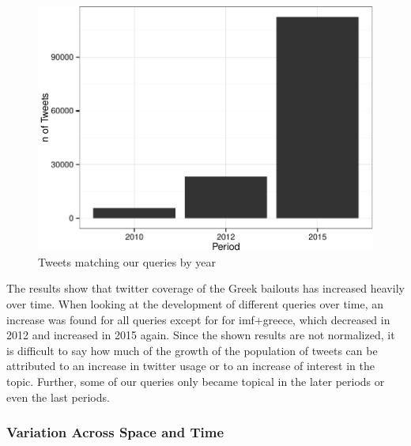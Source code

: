 \documentclass[]{article}
\begin{document}
\begin{figure}

{\centering \includegraphics{fin_paper_files/figure-latex/unnamed-chunk-4-1} 

}

\caption{Tweets matching our queries by year}\label{fig:unnamed-chunk-4}
\end{figure}

The results show that twitter coverage of the Greek bailouts has
increased heavily over time. When looking at the development of
different queries over time, an increase was found for all queries
except for for imf+greece, which decreased in 2012 and increased in 2015
again. Since the shown results are not normalized, it is difficult to
say how much of the growth of the population of tweets can be attributed
to an increase in twitter usage or to an increase of interest in the
topic. Further, some of our queries only became topical in the later
periods or even the last periods.

\subsubsection{Variation Across Space and
Time}\label{variation-across-space-and-time}
\end{document}
